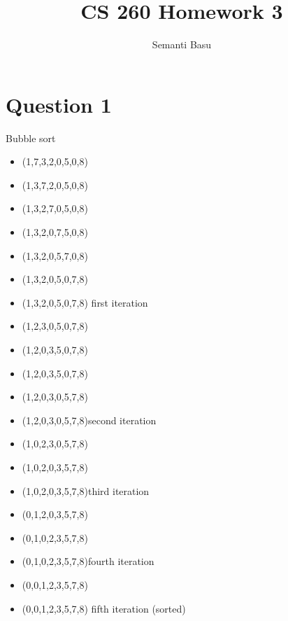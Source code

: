 \documentclass{article}
\begin{document}
\title {CS 260 Homework 3}
\author{Semanti Basu}
\maketitle


\section*{Question 1}

Bubble sort
\begin{itemize}
\item (1,7,3,2,0,5,0,8)
\item (1,3,7,2,0,5,0,8)
\item (1,3,2,7,0,5,0,8)
\item (1,3,2,0,7,5,0,8)
\item (1,3,2,0,5,7,0,8)
\item (1,3,2,0,5,0,7,8)

\item (1,3,2,0,5,0,7,8) first iteration
\item (1,2,3,0,5,0,7,8)
\item (1,2,0,3,5,0,7,8)
\item (1,2,0,3,5,0,7,8)
\item (1,2,0,3,0,5,7,8)

\item (1,2,0,3,0,5,7,8)second iteration

\item (1,0,2,3,0,5,7,8)
\item (1,0,2,0,3,5,7,8)

\item (1,0,2,0,3,5,7,8)third iteration

\item (0,1,2,0,3,5,7,8)
\item (0,1,0,2,3,5,7,8)

\item (0,1,0,2,3,5,7,8)fourth iteration

\item (0,0,1,2,3,5,7,8)

\item (0,0,1,2,3,5,7,8) fifth iteration (sorted)
\end{itemize}
\end{document}
